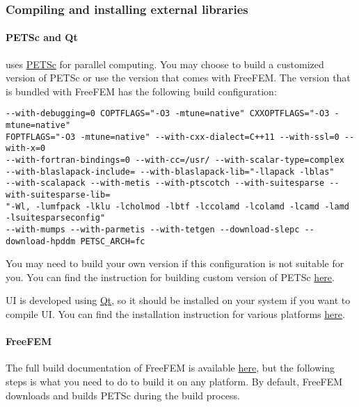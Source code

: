 \subsubsection{Compiling and installing external libraries}

\paragraph{PETSc and Qt}

\biodeg{} uses \href{https://petsc.org/release/}{PETSc} for parallel computing. You may choose to build a customized version of PETSc or use the version that comes with FreeFEM. The version that is bundled with FreeFEM has the following build configuration:

\begin{verbatim}
--with-debugging=0 COPTFLAGS="-O3 -mtune=native" CXXOPTFLAGS="-O3 -mtune=native" 
FOPTFLAGS="-O3 -mtune=native" --with-cxx-dialect=C++11 --with-ssl=0 --with-x=0 
--with-fortran-bindings=0 --with-cc=/usr/ --with-scalar-type=complex
--with-blaslapack-include= --with-blaslapack-lib="-llapack -lblas"
--with-scalapack --with-metis --with-ptscotch --with-suitesparse --with-suitesparse-lib=
"-Wl, -lumfpack -lklu -lcholmod -lbtf -lccolamd -lcolamd -lcamd -lamd -lsuitesparseconfig"
--with-mumps --with-parmetis --with-tetgen --download-slepc --download-hpddm PETSC_ARCH=fc
\end{verbatim}

You may need to build your own version if this configuration is not suitable for you. You can find the instruction for building custom version of PETSc \href{https://petsc.org/release/install/}{here}.

\biodeg{} UI is developed using \href{https://www.qt.io/}{Qt}, so it should be installed on your system if you want to compile \biodeg{} UI. You can find the installation instruction for various platforms \href{https://doc.qt.io/qt-5/gettingstarted.html}{here}.

\paragraph{FreeFEM}

The full build documentation of FreeFEM is available \href{https://doc.freefem.org/introduction/installation.html}{here}, but the following steps is what you need to do to build it on any platform. By default, FreeFEM downloads and builds PETSc during the build process.

